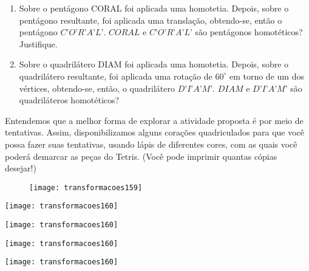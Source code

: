 \begin{enumerate}
\begin{multicols}{2}
\begin{enumerate}
\item {}
{
\texttt{[image: transformacoes154]}
}
\item {}
{
\texttt{[image: transformacoes155]}
}
\item {}
{
\texttt{[image: transformacoes156]}
}
\item {}
{
\texttt{[image: transformacoes157]}
}
\item {}
{
\texttt{[image: transformacoes158]}
}
\end{enumerate}
\end{multicols}

\item Sobre o pentágono CORAL foi aplicada uma homotetia. Depois, sobre o pentágono resultante, foi aplicada uma translação, obtendo-se, então o pentágono $C’O’R’A’L’$. $CORAL$ e $C’O’R’A’L’$ são pentágonos homotéticos? Justifique. 

\item Sobre o quadrilátero DIAM foi aplicada uma homotetia. Depois, sobre o quadrilátero resultante, foi aplicada uma rotação de $60^{\circ}$ em torno de um dos vértices, obtendo-se, então, o quadrilátero $D’I’A’M’$. $DIAM$ e $D’I’A’M’$ são quadriláteros homotéticos?

\end{enumerate}



\ifnum{}
\clearpage
\else
\notasfinais
\fi

Entendemos que a melhor forma de explorar a atividade proposta é por meio de tentativas. Assim, disponibilizamos alguns corações quadriculados para que você possa fazer suas tentativas, usando lápis de diferentes cores, com as quais você poderá demarcar as peças do Tetris. (Você pode imprimir quantas cópias desejar!)

\begin{figure}[H]
\centering

\texttt{[image: transformacoes159]}
\end{figure}

\begin{multicols}{2}


\texttt{[image: transformacoes160]}

\texttt{[image: transformacoes160]}

\texttt{[image: transformacoes160]}

\texttt{[image: transformacoes160]}

\end{multicols}

